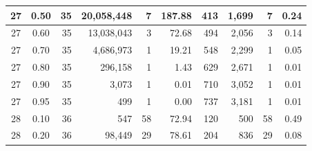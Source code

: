 \begin{table}[H]
\begin{tabular}{|c|c|r|r|r|r|r|r|r|r|}
        27                              & 0.50                               & 35                                              & 20,058,448                                         & 7             & 187.88        & 413           & 1,699            & 7             & 0.24          \\ \hline
        27                              & 0.60                               & 35                                              & 13,038,043                                         & 3             & 72.68         & 494           & 2,056            & 3             & 0.14          \\ \hline
        27                              & 0.70                               & 35                                              & 4,686,973                                          & 1             & 19.21         & 548           & 2,299            & 1             & 0.05          \\ \hline
        27                              & 0.80                               & 35                                              & 296,158                                            & 1             & 1.43          & 629           & 2,671            & 1             & 0.01          \\ \hline
        27                              & 0.90                               & 35                                              & 3,073                                              & 1             & 0.01          & 710           & 3,052            & 1             & 0.01          \\ \hline
        27                              & 0.95                               & 35                                              & 499                                                & 1             & 0.00          & 737           & 3,181            & 1             & 0.01          \\ \hline
        28                              & 0.10                               & 36                                              & 547                                                & 58            & 72.94         & 120           & 500              & 58            & 0.49          \\ \hline
        28                              & 0.20                               & 36                                              & 98,449                                             & 29            & 78.61         & 204           & 836              & 29            & 0.08          \\ \hline

\end{tabular}
\end{table}

